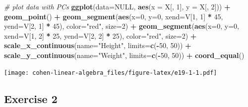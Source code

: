 \documentclass[
]{book}
\newenvironment{Shaded}{\begin{snugshade}}{\end{snugshade}}
\newcommand{\CommentTok}[1]{\textcolor[rgb]{0.56,0.35,0.01}{\textit{#1}}}
\newcommand{\DataTypeTok}[1]{\textcolor[rgb]{0.13,0.29,0.53}{#1}}
\newcommand{\DecValTok}[1]{\textcolor[rgb]{0.00,0.00,0.81}{#1}}
\newcommand{\KeywordTok}[1]{\textcolor[rgb]{0.13,0.29,0.53}{\textbf{#1}}}
\newcommand{\NormalTok}[1]{#1}
\newcommand{\OperatorTok}[1]{\textcolor[rgb]{0.81,0.36,0.00}{\textbf{#1}}}
\newcommand{\OtherTok}[1]{\textcolor[rgb]{0.56,0.35,0.01}{#1}}
\newcommand{\StringTok}[1]{\textcolor[rgb]{0.31,0.60,0.02}{#1}}
\begin{document}
\begin{Shaded}
\begin{Highlighting}[]
\CommentTok{\# plot data with PCs}
\KeywordTok{ggplot}\NormalTok{(}\DataTypeTok{data=}\OtherTok{NULL}\NormalTok{, }\KeywordTok{aes}\NormalTok{(}\DataTypeTok{x =}\NormalTok{ X[, }\DecValTok{1}\NormalTok{], }\DataTypeTok{y =}\NormalTok{ X[, }\DecValTok{2}\NormalTok{])) }\OperatorTok{+}\StringTok{ }
\StringTok{  }\KeywordTok{geom\_point}\NormalTok{() }\OperatorTok{+}\StringTok{ }
\StringTok{  }\KeywordTok{geom\_segment}\NormalTok{(}\KeywordTok{aes}\NormalTok{(}\DataTypeTok{x=}\DecValTok{0}\NormalTok{, }\DataTypeTok{y=}\DecValTok{0}\NormalTok{, }\DataTypeTok{xend=}\NormalTok{V[}\DecValTok{1}\NormalTok{, }\DecValTok{1}\NormalTok{] }\OperatorTok{*}\StringTok{ }\DecValTok{45}\NormalTok{, }\DataTypeTok{yend=}\NormalTok{V[}\DecValTok{2}\NormalTok{, }\DecValTok{1}\NormalTok{] }\OperatorTok{*}\StringTok{ }\DecValTok{45}\NormalTok{), }\DataTypeTok{color=}\StringTok{"red"}\NormalTok{, }\DataTypeTok{size=}\DecValTok{2}\NormalTok{) }\OperatorTok{+}
\StringTok{  }\KeywordTok{geom\_segment}\NormalTok{(}\KeywordTok{aes}\NormalTok{(}\DataTypeTok{x=}\DecValTok{0}\NormalTok{, }\DataTypeTok{y=}\DecValTok{0}\NormalTok{, }\DataTypeTok{xend=}\NormalTok{V[}\DecValTok{1}\NormalTok{, }\DecValTok{2}\NormalTok{] }\OperatorTok{*}\StringTok{ }\DecValTok{25}\NormalTok{, }\DataTypeTok{yend=}\NormalTok{V[}\DecValTok{2}\NormalTok{, }\DecValTok{2}\NormalTok{] }\OperatorTok{*}\StringTok{ }\DecValTok{25}\NormalTok{), }\DataTypeTok{color=}\StringTok{"red"}\NormalTok{, }\DataTypeTok{size=}\DecValTok{2}\NormalTok{) }\OperatorTok{+}
\StringTok{  }\KeywordTok{scale\_x\_continuous}\NormalTok{(}\DataTypeTok{name=}\StringTok{"Height"}\NormalTok{, }\DataTypeTok{limits=}\KeywordTok{c}\NormalTok{(}\OperatorTok{{-}}\DecValTok{50}\NormalTok{, }\DecValTok{50}\NormalTok{)) }\OperatorTok{+}\StringTok{ }
\StringTok{  }\KeywordTok{scale\_y\_continuous}\NormalTok{(}\DataTypeTok{name=}\StringTok{"Weight"}\NormalTok{, }\DataTypeTok{limits=}\KeywordTok{c}\NormalTok{(}\OperatorTok{{-}}\DecValTok{50}\NormalTok{, }\DecValTok{50}\NormalTok{)) }\OperatorTok{+}\StringTok{ }
\StringTok{  }\KeywordTok{coord\_equal}\NormalTok{()}
\end{Highlighting}
\end{Shaded}

\texttt{[image: cohen-linear-algebra\_files/figure-latex/e19-1-1.pdf]}

\hypertarget{exercise-2-13}{%
\subsection*{Exercise 2}\label{exercise-2-13}}
\end{document}
